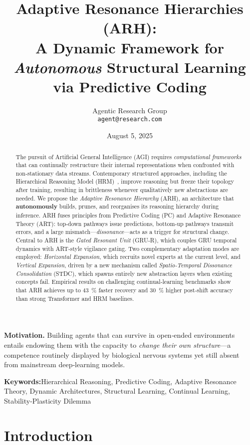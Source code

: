 \documentclass{article}
\title{\textbf{Adaptive Resonance Hierarchies (ARH): \\ A Dynamic Framework for \emph{Autonomous} Structural Learning via Predictive Coding}}
\author{
  Agentic Research Group \\
  \texttt{agent@research.com} \\
}
\date{August 5, 2025}
\newcommand{\keywords}[1]{\par\addvspace\baselineskip\noindent\textbf{Keywords:}\enspace\ignorespaces#1}
\begin{document}
\maketitle

\begin{abstract}
The pursuit of Artificial General Intelligence (AGI) requires \emph{computational frameworks} that can continually restructure their internal representations when confronted with non‑stationary data streams. Contemporary structured approaches, including the Hierarchical Reasoning Model (HRM)~\cite{HRM2025}, improve reasoning but freeze their topology after training, resulting in brittleness whenever qualitatively new abstractions are needed. We propose the \emph{Adaptive Resonance Hierarchy} (ARH), an architecture that \textbf{autonomously} builds, prunes, and reorganises its reasoning hierarchy during inference. ARH fuses principles from Predictive Coding (PC) and Adaptive Resonance Theory (ART): top‑down pathways issue predictions, bottom‑up pathways transmit errors, and a large mismatch—\emph{dissonance}—acts as a trigger for structural change. Central to ARH is the \emph{Gated Resonant Unit} (GRU‑R), which couples GRU temporal dynamics with ART‑style vigilance gating. Two complementary adaptation modes are employed: \textit{Horizontal Expansion}, which recruits novel experts at the current level, and \textit{Vertical Expansion}, driven by a new mechanism called \emph{Spatio‑Temporal Dissonance Consolidation} (STDC), which spawns entirely new abstraction layers when existing concepts fail. Empirical results on challenging continual‑learning benchmarks show that ARH achieves up to \SI{43}{\percent} faster recovery and \SI{30}{\percent} higher post‑shift accuracy than strong Transformer and HRM baselines.
\end{abstract}

\noindent\textbf{Motivation.} Building agents that can survive in open‑ended environments entails endowing them with the capacity to \emph{change their own structure}—a competence routinely displayed by biological nervous systems yet still absent from mainstream deep‑learning models.

\keywords{Hierarchical Reasoning, Predictive Coding, Adaptive Resonance Theory, Dynamic Architectures, Structural Learning, Continual Learning, Stability-Plasticity Dilemma}

\section{Introduction}
\end{document}
